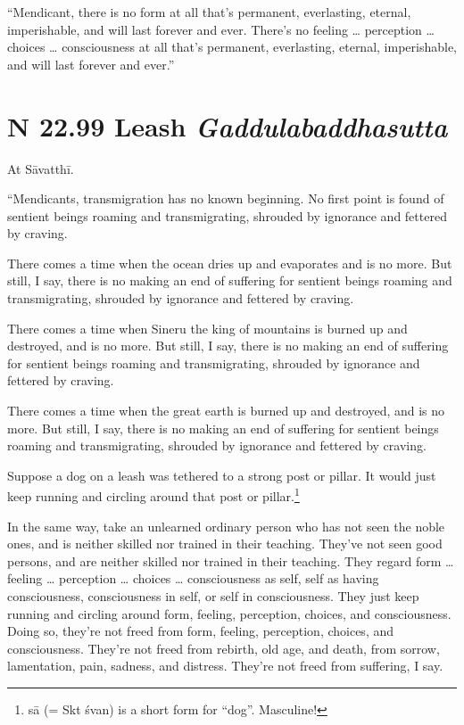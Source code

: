 \documentclass[12pt,openany]{book}%
\newcommand*{\suttatitleacronym}[1]{\smaller[2]{#1}\vspace*{.3em}}
\newcommand*{\suttatitletranslation}[1]{\linebreak{#1}}
\newcommand*{\suttatitleroot}[1]{\linebreak\smaller[2]\itshape{#1}}
\newcommand*{\tocacronym}[1]{\hspace*{-3.3em}{#1}\quad}
\newcommand*{\toctranslation}[1]{#1}
\newcommand*{\tocroot}[1]{(\textit{#1})}
\begin{document}
“Mendicant, there is no form at all that’s permanent, everlasting, eternal, imperishable, and will last forever and ever. There’s no feeling … perception … choices … consciousness at all that’s permanent, everlasting, eternal, imperishable, and will last forever and ever.” 

%
\section*{{\suttatitleacronym SN 22.99}{\suttatitletranslation A Leash }{\suttatitleroot Gaddulabaddhasutta}}
\addcontentsline{toc}{section}{\tocacronym{SN 22.99} \toctranslation{A Leash } \tocroot{Gaddulabaddhasutta}}

At \textsanskrit{Sāvatthī}. 

“Mendicants, transmigration has no known beginning. No first point is found of sentient beings roaming and transmigrating, shrouded by ignorance and fettered by craving. 

There comes a time when the ocean dries up and evaporates and is no more. But still, I say, there is no making an end of suffering for sentient beings roaming and transmigrating, shrouded by ignorance and fettered by craving. 

There comes a time when Sineru the king of mountains is burned up and destroyed, and is no more. But still, I say, there is no making an end of suffering for sentient beings roaming and transmigrating, shrouded by ignorance and fettered by craving. 

There comes a time when the great earth is burned up and destroyed, and is no more. But still, I say, there is no making an end of suffering for sentient beings roaming and transmigrating, shrouded by ignorance and fettered by craving. 

Suppose a dog on a leash was tethered to a strong post or pillar. It would just keep running and circling around that post or pillar.\footnote{\textsanskrit{sā} (= Skt \textsanskrit{śvan}) is a short form for “dog”. Masculine! } 

In the same way, take an unlearned ordinary person who has not seen the noble ones, and is neither skilled nor trained in their teaching. They’ve not seen good persons, and are neither skilled nor trained in their teaching. They regard form … feeling … perception … choices … consciousness as self, self as having consciousness, consciousness in self, or self in consciousness. They just keep running and circling around form, feeling, perception, choices, and consciousness. Doing so, they’re not freed from form, feeling, perception, choices, and consciousness. They’re not freed from rebirth, old age, and death, from sorrow, lamentation, pain, sadness, and distress. They’re not freed from suffering, I say. 
\end{document}
